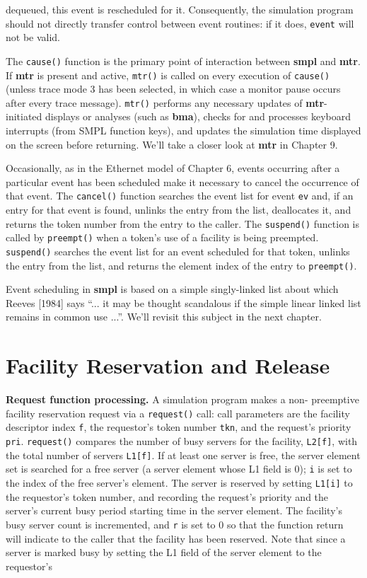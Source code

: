 \noindent dequeued, this event is rescheduled for it. Consequently, the simulation
program should not directly transfer control between event routines: if it
does, \texttt{event} will not be valid.

The \texttt{cause()} function is the primary point of interaction between \textbf{smpl}
and \textbf{mtr}. If \textbf{mtr} is present and active, \texttt{mtr()} is called on every execution of
\texttt{cause()} (unless trace mode 3 has been selected, in which case a monitor
pause occurs after every trace message). \texttt{mtr()} performs any necessary
updates of \textbf{mtr}-initiated displays or analyses (such as \textbf{bma}), checks for and
processes keyboard interrupts (from SMPL function keys), and updates the
simulation time displayed on the screen before returning. We'll take a closer
look at \textbf{mtr} in Chapter 9.

Occasionally, as in the Ethernet model of Chapter 6, events occurring
after a particular event has been scheduled make it necessary to cancel the
occurrence of that event. The \texttt{cancel()} function searches the event list for
event \texttt{ev} and, if an entry for that event is found, unlinks the entry from the
list, deallocates it, and returns the token number from the entry to the caller.
The \texttt{suspend()} function is called by \texttt{preempt()} when a token's use of a
facility is being preempted. \texttt{suspend()} searches the event list for an event
scheduled for that token, unlinks the entry from the list, and returns the
element index of the entry to \texttt{preempt()}.

Event scheduling in \textbf{smpl} is based on a simple singly-linked list about
which Reeves [1984] says ``... it may be thought scandalous if the simple
linear linked list remains in common use ...''. We'll revisit this subject in the
next chapter.

\section{Facility Reservation and Release}

\textbf{Request function processing.} A simulation program makes a non-
preemptive facility reservation request via a \texttt{request()} call: call
parameters are the facility descriptor index \texttt{f}, the requestor's token number
\texttt{tkn}, and the request's priority \texttt{pri}. \texttt{request()} compares the number of busy
servers for the facility, \texttt{L2[f]}, with the total number of servers \texttt{L1[f]}. If
at least one server is free, the server element set is searched for a free server
(a server element whose L1 field is 0); \texttt{i} is set to the index of the free
server's element. The server is reserved by setting \texttt{L1[i]} to the requestor's
token number, and recording the request's priority and the server's current
busy period starting time in the server element. The facility's busy server
count is incremented, and \texttt{r} is set to 0 so that the function return will indicate
to the caller that the facility has been reserved. Note that since a server is
marked busy by setting the L1 field of the server element to the requestor's

